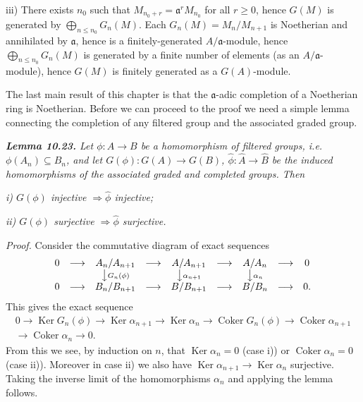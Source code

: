 
iii) There exists $n_0$ such that $M_{n_0+r}=\mathfrak a^rM_{n_0}$ for all $r\geq0$, hence $G(M)$ is
generated by $\bigoplus_{n\leq n_0}G_n(M)$.  Each $G_n(M)=M_n/M_{n+1}$ is Noetherian and
annihilated by $\mathfrak a$, hence is a finitely-generated $A/\mathfrak a$-module, hence $\bigoplus_{n\leq n_0}G_n(M)$
is generated by a finite number of elements (as an $A/\mathfrak a$-module), hence $G(M)$ is
finitely generated as a $G(A)$-module.\proofbox

The last main result of this chapter is that the $\mathfrak a$-adic completion of a
Noetherian ring is Noetherian.  Before we can proceed to the proof we need a
simple lemma connecting the completion of any filtered group and the associated graded group.

\medskip
\noindent\textit{\textbf{Lemma 10.23.} Let $\phi:A\longrightarrow B$ be a homomorphism of filtered groups, i.e.
$\phi(A_n)\subseteq B_n$, and let $G(\phi):G(A)\longrightarrow G(B)$, $\widehat\phi:\widehat A\longrightarrow\widehat B$ be the induced homomorphisms of the associated graded and completed groups.  Then}

\noindent\textit{i) $G(\phi)$ injective $\Rightarrow\widehat\phi$ injective;}

\noindent\textit{ii) $G(\phi)$ surjective $\Rightarrow\widehat\phi$ surjective.}

\noindent\emph{Proof.}  Consider the commutative diagram of exact sequences
\[
\begin{array}{ccccccccc}
0&\longrightarrow&A_n/A_{n+1}&\longrightarrow&A/A_{n+1}&\longrightarrow&A/A_n&\longrightarrow&0\\
&&\big\downarrow{\scriptstyle G_n(\phi)}&&\big\downarrow{\scriptstyle\alpha_{n+1}}&&\big\downarrow{\scriptstyle\alpha_n}&&\\
0&\longrightarrow&B_n/B_{n+1}&\longrightarrow&B/B_{n+1}&\longrightarrow&B/B_n&\longrightarrow&0.
\end{array}
\]
This gives the exact sequence
\[
\begin{split}
0\longrightarrow\operatorname{Ker}G_n(\phi)\longrightarrow\operatorname{Ker}\alpha_{n+1}\longrightarrow\operatorname{Ker}\alpha_n
\longrightarrow\operatorname{Coker}G_n(\phi)\longrightarrow\operatorname{Coker}\alpha_{n+1}\\
\longrightarrow\operatorname{Coker}\alpha_n\longrightarrow0.
\end{split}
\]
From this we see, by induction on $n$, that $\operatorname{Ker}\alpha_n=0$ (case i)) or $\operatorname{Coker}\alpha_n=0$
(case ii)).  Moreover in case ii) we also have $\operatorname{Ker}\alpha_{n+1}\longrightarrow\operatorname{Ker}\alpha_n$ surjective.
Taking the inverse limit of the homomorphisms $\alpha_n$ and applying  the lemma
follows.\proofbox

